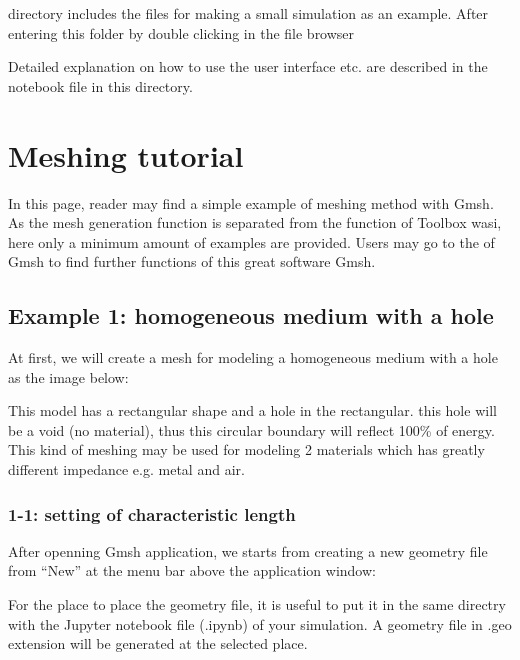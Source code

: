 \documentclass[letterpaper,10pt,english]{sphinxmanual}
\begin{document}
 directory includes the files for making a small simulation as an example.
After entering this folder by double clicking in the file browser

Detailed explanation on how to use the user interface etc. are described in the notebook file  in this directory.


\chapter{Meshing tutorial}
\label{\detokenize{meshing:meshing-tutorial}}\label{\detokenize{meshing::doc}}
In this page, reader may find a simple example of meshing method with Gmsh. As the mesh generation function is separated from the function of Toolbox wasi, here only a minimum amount of examples are provided. Users may go to the  of Gmsh to find further functions of this great software Gmsh.


\section{Example 1: homogeneous medium with a hole}
\label{\detokenize{meshing:example-1-homogeneous-medium-with-a-hole}}
At first, we will create a mesh for modeling a homogeneous medium with a hole as the image below:



This model has a rectangular shape and a hole in the rectangular. this hole will be a void (no material), thus this circular boundary will reflect 100\% of energy. This kind of meshing may be used for modeling 2 materials which has greatly different impedance e.g. metal and air.


\subsection{1-1: setting of characteristic length}
\label{\detokenize{meshing:setting-of-characteristic-length}}
After openning Gmsh application, we starts from creating a new geometry file from “New” at the menu bar above the application window:



For the place to place the geometry file, it is useful to put it in the same directry with the Jupyter notebook file (.ipynb) of your simulation. A geometry file in .geo extension will be generated at the selected place.
\end{document}
